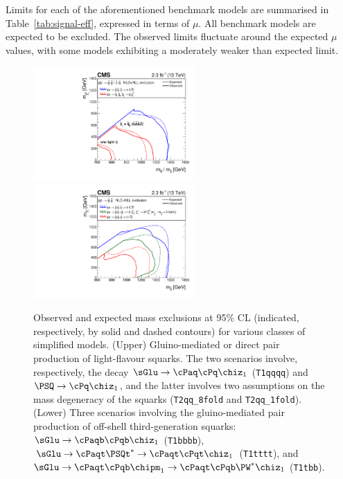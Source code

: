 Limits for each of the aforementioned benchmark models are summarised
in Table~\ref{tab:signal-eff}, expressed in terms of $\mu$. All
benchmark models are expected to be excluded. The observed limits
fluctuate around the expected $\mu$ values, with some models
exhibiting a moderately weaker than expected limit.

\begin{figure}[h!]
  \begin{center}
    \includegraphics[width=0.55\textwidth]{figures/limits/v3/mixSUMMARY.pdf}
    \includegraphics[width=0.55\textwidth]{figures/limits/v3/gluinoSUMMARY.pdf} 
    \caption{Observed and expected mass exclusions at 95\% CL
      (indicated, respectively, by solid and dashed contours) for
      various classes of simplified models. (Upper) Gluino-mediated or
      direct pair production of light-flavour squarks. The two
      scenarios involve, respectively, the decay
      $\sGlu\ra\cPaq\cPq\chiz_1$ (\texttt{T1qqqq}) and
      $\PSQ\ra\cPq\chiz_1$, and the latter involves two assumptions on
      the mass degeneracy of the squarks (\texttt{T2qq\_8fold} and
      \texttt{T2qq\_1fold}). (Lower) Three scenarios involving the
      gluino-mediated pair production of off-shell third-generation
      squarks: $\sGlu\ra\cPaqb\cPqb\chiz_1$ (\texttt{T1bbbb}),
      $\sGlu\ra\cPaqt\PSQt^*\ra\cPaqt\cPqt\chiz_1$ (\texttt{T1tttt}),
      and $\sGlu\ra\cPaqt\cPqb\chipm_1\ra\cPaqt\cPqb\PW^*\chiz_1$
      (\texttt{T1tbb}).  }
    \label{fig:limits-sms-1} 
    \vspace{2.0cm} %
  \end{center}
\end{figure}

